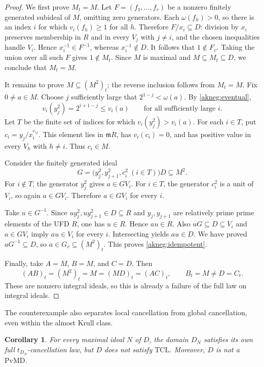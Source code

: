 \documentclass[11pt]{amsart}
\newtheorem{corollary}[corollary]{Corollary}
\theoremstyle{definition}
\theoremstyle{remark}
\newcommand{\PvMD}{\mathrm{PvMD}}
\newcommand{\TCL}{\mathrm{TCL}}
\newcommand{\m}{\mathfrak m}
\begin{document}
\begin{proof}
We first prove $M_t=M$.  Let $F=(f_1,\ldots,f_r)$ be a nonzero finitely
generated subideal of $M$, omitting zero generators.  Each
$\omega(f_h)>0$, so there is an index $i$ for which $v_i(f_h)\ge1$ for
all $h$.  Therefore $F/x_i\subseteq D$: division by $x_i$ preserves
membership in $R$ and in every $V_j$ with $j\ne i$, and the chosen
inequalities handle $V_i$.  Hence $x_i^{-1}\in F^{-1}$, whereas
$x_i^{-1}\notin D$.  It follows that $1\notin F_v$.  Taking the union
over all such $F$ gives $1\notin M_t$.  Since $M$ is maximal and
$M\subseteq M_t\subseteq D$, we conclude that $M_t=M$.

It remains to prove $M\subseteq(M^2)_t$; the reverse inclusion follows
from $M_t=M$.  Fix $0\ne a\in M$.  Choose $j$ sufficiently large that
$2^{1-j}<\omega(a)$.  By \eqref{akneg:eventual},
\[
 v_i(y_j^2)=2^{i+1-j}\le v_i(a)
 \qquad\text{for all sufficiently large }i.
\]
Let $T$ be the finite set of indices for which $v_i(y_j^2)>v_i(a)$.
For each $i\in T$, put $c_i=y_j/x_i^{e_{ij}}$.  This element lies in
$\m R$, has $v_i(c_i)=0$, and has positive value in every $V_h$ with
$h\ne i$.  Thus $c_i\in M$.

Consider the finitely generated ideal
\begin{equation}\label{akneg:witness}
 G=\bigl(y_j^2,y_{j+1}^2,c_i^2\ (i\in T)\bigr)D\subseteq M^2.
\end{equation}
For $i\notin T$, the generator $y_j^2$ gives $a\in GV_i$.
For $i\in T$, the generator $c_i^2$ is a unit of $V_i$, so again
$a\in GV_i$.  Therefore $a\in GV_i$ for every $i$.

Take $u\in G^{-1}$.  Since $uy_j^2,uy_{j+1}^2\in D\subseteq R$ and
$y_j,y_{j+1}$ are relatively prime prime elements of the UFD $R$, one
has $u\in R$.  Hence $au\in R$.  Also $uG\subseteq D\subseteq V_i$
and $a\in GV_i$ imply $au\in V_i$ for every $i$.  Intersecting yields
$au\in D$.  We have proved $aG^{-1}\subseteq D$, so
$a\in G_v\subseteq(M^2)_t$.  This proves \eqref{akneg:idempotent}.

Finally, take $A=M$, $B=M$, and $C=D$.  Then
\[
 (AB)_t=(M^2)_t=M=(MD)_t=(AC)_t,
 \qquad B_t=M\ne D=C_t.
\]
These are nonzero integral ideals, so this is already a failure of the
full law on integral ideals.
\end{proof}

The counterexample also separates local cancellation from global
cancellation, even within the almost Krull class.

\begin{corollary}\label{akneg:local-failure}
For every maximal ideal $N$ of $D$, the domain $D_N$ satisfies its own
full $t_{D_N}$-cancellation law, but $D$ does not satisfy $\TCL$.
Moreover, $D$ is not a $\PvMD$.
\end{corollary}
\end{document}
